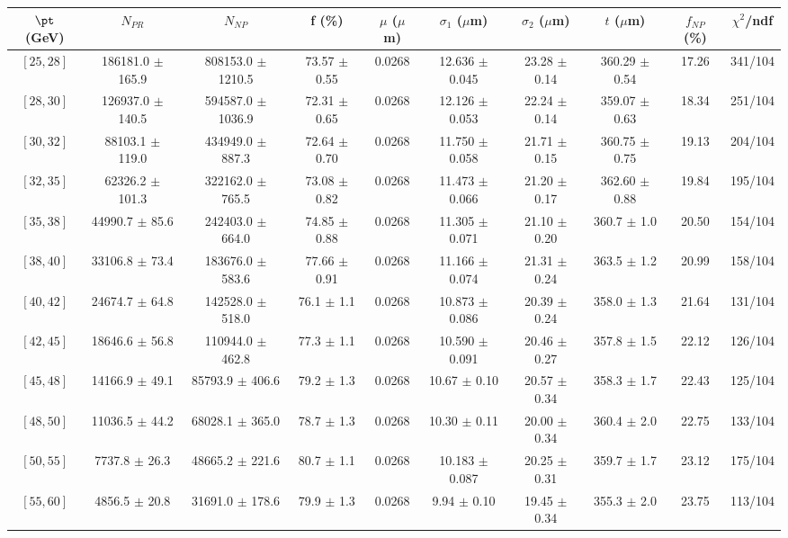 \begin{tabular}{c||c|c|c|c|c|c|c||c|c}
$\pt$ (GeV) & $N_{PR}$ & $N_{NP}$ & f (\%) & $\mu$ ($\mu$m) & $\sigma_1$ ($\mu$m) & $\sigma_2$ ($\mu$m)  & $t$ ($\mu$m) & $f_{NP}$ (\%) & $\chi^2$/ndf \\
\hline
$[25, 28]$ & 186181.0 $\pm$ 165.9 & 808153.0 $\pm$ 1210.5 & 73.57 $\pm$ 0.55 & 0.0268 & 12.636 $\pm$ 0.045 & 23.28 $\pm$ 0.14 & 360.29 $\pm$ 0.54 & 17.26 & 341/104\\
$[28, 30]$ & 126937.0 $\pm$ 140.5 & 594587.0 $\pm$ 1036.9 & 72.31 $\pm$ 0.65 & 0.0268 & 12.126 $\pm$ 0.053 & 22.24 $\pm$ 0.14 & 359.07 $\pm$ 0.63 & 18.34 & 251/104\\
$[30, 32]$ & 88103.1 $\pm$ 119.0 & 434949.0 $\pm$ 887.3 & 72.64 $\pm$ 0.70 & 0.0268 & 11.750 $\pm$ 0.058 & 21.71 $\pm$ 0.15 & 360.75 $\pm$ 0.75 & 19.13 & 204/104\\
$[32, 35]$ & 62326.2 $\pm$ 101.3 & 322162.0 $\pm$ 765.5 & 73.08 $\pm$ 0.82 & 0.0268 & 11.473 $\pm$ 0.066 & 21.20 $\pm$ 0.17 & 362.60 $\pm$ 0.88 & 19.84 & 195/104\\
$[35, 38]$ & 44990.7 $\pm$ 85.6 & 242403.0 $\pm$ 664.0 & 74.85 $\pm$ 0.88 & 0.0268 & 11.305 $\pm$ 0.071 & 21.10 $\pm$ 0.20 & 360.7 $\pm$ 1.0 & 20.50 & 154/104\\
$[38, 40]$ & 33106.8 $\pm$ 73.4 & 183676.0 $\pm$ 583.6 & 77.66 $\pm$ 0.91 & 0.0268 & 11.166 $\pm$ 0.074 & 21.31 $\pm$ 0.24 & 363.5 $\pm$ 1.2 & 20.99 & 158/104\\
$[40, 42]$ & 24674.7 $\pm$ 64.8 & 142528.0 $\pm$ 518.0 & 76.1 $\pm$ 1.1 & 0.0268 & 10.873 $\pm$ 0.086 & 20.39 $\pm$ 0.24 & 358.0 $\pm$ 1.3 & 21.64 & 131/104\\
$[42, 45]$ & 18646.6 $\pm$ 56.8 & 110944.0 $\pm$ 462.8 & 77.3 $\pm$ 1.1 & 0.0268 & 10.590 $\pm$ 0.091 & 20.46 $\pm$ 0.27 & 357.8 $\pm$ 1.5 & 22.12 & 126/104\\
$[45, 48]$ & 14166.9 $\pm$ 49.1 & 85793.9 $\pm$ 406.6 & 79.2 $\pm$ 1.3 & 0.0268 & 10.67 $\pm$ 0.10 & 20.57 $\pm$ 0.34 & 358.3 $\pm$ 1.7 & 22.43 & 125/104\\
$[48, 50]$ & 11036.5 $\pm$ 44.2 & 68028.1 $\pm$ 365.0 & 78.7 $\pm$ 1.3 & 0.0268 & 10.30 $\pm$ 0.11 & 20.00 $\pm$ 0.34 & 360.4 $\pm$ 2.0 & 22.75 & 133/104\\
$[50, 55]$ & 7737.8 $\pm$ 26.3 & 48665.2 $\pm$ 221.6 & 80.7 $\pm$ 1.1 & 0.0268 & 10.183 $\pm$ 0.087 & 20.25 $\pm$ 0.31 & 359.7 $\pm$ 1.7 & 23.12 & 175/104\\
$[55, 60]$ & 4856.5 $\pm$ 20.8 & 31691.0 $\pm$ 178.6 & 79.9 $\pm$ 1.3 & 0.0268 & 9.94 $\pm$ 0.10 & 19.45 $\pm$ 0.34 & 355.3 $\pm$ 2.0 & 23.75 & 113/104\\

\end{tabular}
